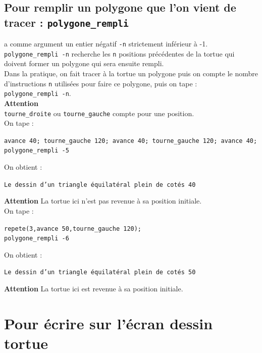 \documentclass[a4paper,11pt]{book}
\begin{document}
\subsection{Pour remplir un polygone que l'on vient de tracer : {\tt polygone\_rempli}}
 a comme argument un entier n\'egatif  {\tt -n}
 strictement inf\'erieur \`a -1.\\
{\tt polygone\_rempli -n} recherche les  {\tt n} positions pr\'ec\'edentes de 
la tortue qui doivent former un polygone qui sera ensuite rempli.\\
Dans la pratique, on fait tracer \`a la tortue un polygone puis on compte le
 nombre d'instructions {\tt n} utilis\'ees pour faire ce polygone, puis on tape :\\
{\tt polygone\_rempli -n}.\\ 
{\bf Attention} \\
{\tt tourne\_droite} ou {\tt tourne\_gauche} compte pour une position.\\
On tape :
\begin{center}{\tt avance 40; tourne\_gauche 120; avance 40; tourne\_gauche 120; avance 40; polygone\_rempli -5}\end{center}
On obtient :
\begin{center}{\tt Le dessin d'un triangle \'equilat\'eral plein de cot\'es 40}\end{center}
{\bf Attention} La tortue ici n'est pas revenue \`a sa position initiale.\\
On tape :
\begin{center}{\tt repete(3,avance 50,tourne\_gauche 120);\\
polygone\_rempli -6}\end{center}
On obtient :
\begin{center}{\tt Le dessin d'un triangle \'equilat\'eral plein de cot\'es 50}\end{center}
{\bf Attention} La tortue ici est revenue \`a sa position initiale.

\section{Pour \'ecrire sur l'\'ecran dessin tortue}
\end{document}

